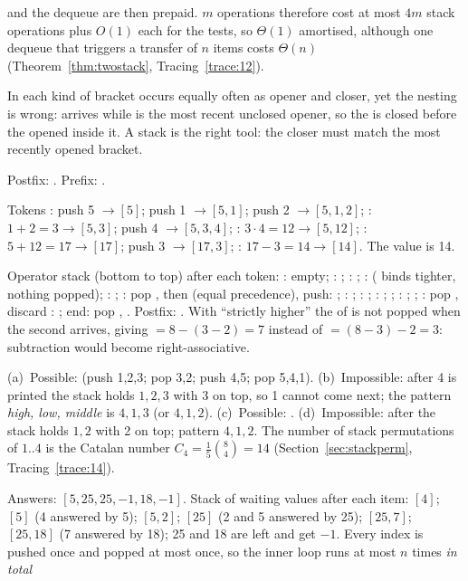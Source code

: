 \begin{questions}
  and the dequeue are then prepaid. $m$ operations therefore cost at most $4m$ stack
  operations plus $O(1)$ each for the tests, so $\Theta(1)$ amortised, although one
  dequeue that triggers a transfer of $n$ items costs $\Theta(n)$
  (Theorem~\ref{thm:twostack}, Tracing~\ref{trace:12}).
\item In \cc{([)]} each kind of bracket occurs equally often as opener and closer, yet the
  nesting is wrong: \cc{)} arrives while \cc{[} is the most recent unclosed opener, so
  the \cc{(} is closed before the \cc{[} opened inside it.
  A stack is the right tool: the closer must match the most recently opened bracket.
\item Postfix: . Prefix: .
\item Tokens : push 5 $\to[5]$; push 1 $\to[5,1]$; push 2
  $\to[5,1,2]$; \cc{+}: $1+2=3\to[5,3]$; push 4 $\to[5,3,4]$; \cc{*}: $3\cdot4=12\to
  [5,12]$; \cc{+}: $5+12=17\to[17]$; push 3 $\to[17,3]$; \cc{-}: $17-3=14\to[14]$. The
  value is 14.
\item Operator stack (bottom to top) after each token: : empty; \cc{-}: \cc{-};
  : \cc{-}; \cc{*}: \cc{- *} (\cc{*} binds tighter, nothing popped); :
  \cc{- *}; \cc{+}: pop \cc{*}, then \cc{-} (equal precedence), push: \cc{+}; :
  \cc{+}; \cc{/}: \cc{+ /}; \cc{(}: \cc{+ / (}; ; \cc{-}: \cc{+ / ( -}; ;
  \cc{)}: pop \cc{-}, discard \cc{(}: \cc{+ /}; end: pop \cc{/}, \cc{+}. Postfix:
  . With ``strictly higher'' the \cc{-} of  is not popped
  when the second \cc{-} arrives, giving  $=8-(3-2)=7$ instead of
   $=(8-3)-2=3$: subtraction would become right-associative.
\item (a)~Possible:  (push 1,2,3; pop 3,2; push 4,5; pop 5,4,1).
  (b)~Impossible: after 4 is printed the stack holds $1,2,3$ with 3 on top, so 1 cannot
  come next; the pattern \emph{high, low, middle} is $4,1,3$ (or $4,1,2$).
  (c)~Possible: . (d)~Impossible: after  the stack holds $1,2$
  with 2 on top; pattern $4,1,2$. The number of stack permutations of $1..4$ is the
  Catalan number $C_4=\frac{1}{5}\binom84=14$ (Section~\ref{sec:stackperm},
  Tracing~\ref{trace:14}).
\item Answers: $[5,25,25,-1,18,-1]$. Stack of waiting values after each item: $[4]$;
  $[5]$ (4 answered by 5); $[5,2]$; $[25]$ (2 and 5 answered by 25); $[25,7]$;
  $[25,18]$ (7 answered by 18); 25 and 18 are left and get $-1$. Every index is pushed
  once and popped at most once, so the inner loop runs at most $n$ times \emph{in total}

\end{questions}
